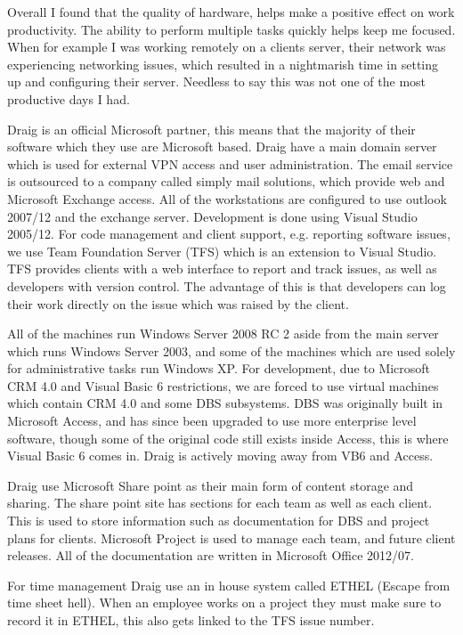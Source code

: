 \documentclass[paper=a4, fontsize=11pt]{scrartcl}	%
\begin{document}
Overall I found that the quality of hardware, helps make a positive effect on work productivity. The ability to perform multiple tasks quickly helps keep me focused. When for example I was working remotely on a clients server, their network was experiencing networking issues, which resulted in a nightmarish time in setting up and configuring their server. Needless to say this was not one of the most productive days I had. 

Draig is an official Microsoft partner, this means that the majority of their software which they use are Microsoft based. Draig have a main domain server which is used for external VPN access and user administration. The email service is outsourced to a company called simply mail solutions\cite{simplymail}, which provide web and Microsoft Exchange access. All of the workstations are configured to use outlook 2007/12 and the exchange server. Development is done using Visual Studio 2005/12\cite{VS}. For code management and client support, e.g. reporting software issues, we use Team Foundation Server (TFS)\cite{TFS} which is an extension to Visual Studio. TFS provides clients with a web interface to report and track issues, as well as developers with version control. The advantage of this is that developers can log their work directly on the issue which was raised by the client. 

All of the machines run Windows Server 2008 RC 2 aside from the main server which runs Windows Server 2003, and some of the machines which are used solely for administrative tasks  run Windows XP. For development, due to Microsoft CRM 4.0\cite{CRM} and Visual Basic 6 restrictions, we are forced to use virtual machines which contain CRM 4.0 and some DBS subsystems. DBS was originally built in Microsoft Access, and has since been upgraded to use more enterprise level software, though some of the original code still exists inside Access, this is where Visual Basic 6 comes in. Draig is actively moving away from VB6 and Access.

Draig use Microsoft Share point as their main form of content storage and sharing. The share point site has sections for each team as well as each client.  This is used to store information such as documentation for DBS and project plans for clients. Microsoft Project\cite{project} is used to manage each team, and future client releases. All of the documentation are written in Microsoft Office 2012/07.

For time management Draig use an in house system called ETHEL (Escape from time sheet hell). When an employee works on a project they must make sure to record it in ETHEL, this also gets linked to the TFS issue number.
\end{document}
